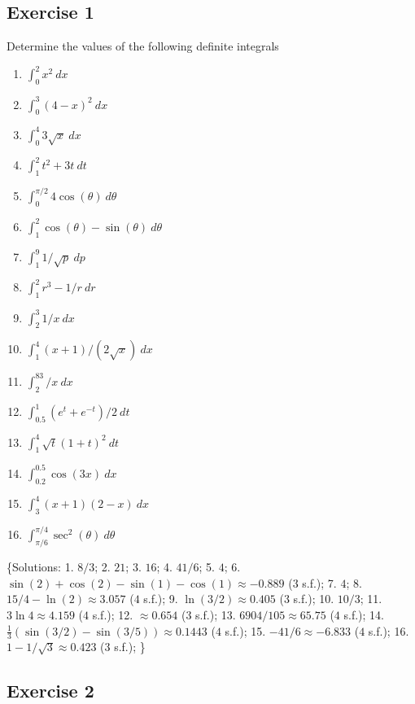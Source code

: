 \documentclass[
  english,
  11pt,
  oneside]{book}
\providecommand{\tightlist}{%
  \setlength{\itemsep}{0pt}\setlength{\parskip}{0pt}}
\newcommand{\slide}{}
\theoremstyle{definition}
\theoremstyle{definition}
\theoremstyle{definition}
\theoremstyle{definition}
\theoremstyle{remark}
\begin{document}
\subsection*{Exercise 1}\label{exercise-1-6}

Determine the values of the following definite integrals

\begin{enumerate}
\def\labelenumi{\arabic{enumi}.}
\tightlist
\item
  \(\int_0^2 x^2\ dx\)
\item
  \(\int_0^3 (4-x)^2\ dx\)
\item
  \(\int_0^4 3\sqrt{x}\ dx\)
\item
  \(\int_1^2 t^2+3t\ dt\)
\item
  \(\int_0^{\pi/2}4\cos(\theta) \ d\theta\)
\item
  \(\int_1^2 \cos(\theta)-\sin(\theta)\ d\theta\)
\item
  \(\int_1^9 1/\sqrt{p}\ dp\)
\item
  \(\int_1^2 r^3-1/r\ dr\)
\item
  \(\int_2^3 1/x\ dx\)
\item
  \(\int_1^4 (x+1)/(2\sqrt{x})\ dx\)
\item
  \(\int_2^83/x \ dx\)
\item
  \(\int_{0.5}^1(e^t+e^{-t})/2 \ dt\)
\item
  \(\int_1^4 \sqrt{t}(1+t)^2 \ dt\)
\item
  \(\int_{0.2}^{0.5} \cos(3x)\ dx\)
\item
  \(\int_3^4 (x+1)(2-x)\ dx\)
\item
  \(\int_{\pi/6}^{\pi/4} \sec^2(\theta)\ d\theta\)
\end{enumerate}

\{Solutions:
1. \(8/3\);
2. \(21\);
3. \(16\);
4. \(41/6\);
5. \(4\);
6. \(\sin(2)+\cos(2)-\sin(1)-\cos(1) \approx -0.889\) (\(3\) s.f.);
7. \(4\);
8. \(15/4 - \ln(2) \approx 3.057\) (\(4\) s.f.);
9. \(\ln(3/2) \approx 0.405\) (\(3\) s.f.);
10. \(10/3\);
11. \(3\ln4 \approx 4.159\) (\(4\) s.f.);
12. \(\approx 0.654\) (\(3\) s.f.);
13. \(6904/105 \approx 65.75\) (\(4\) s.f.);
14. \(\frac{1}{3}(\sin(3/2)-\sin(3/5)) \approx 0.1443\) (\(4\) s.f.);
15. \(-41/6 \approx -6.833\) (\(4\) s.f.);
16. \(1-1/\sqrt{3} \approx 0.423\) (\(3\) s.f.);
\}

\slide

\subsection*{Exercise 2}\label{exercise-2-6}
\end{document}
